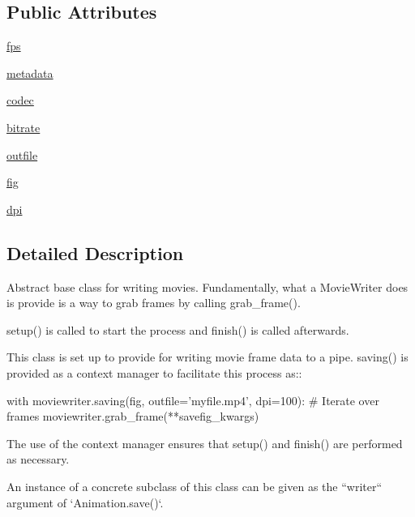\subsection*{Public Attributes}
\begin{DoxyCompactItemize}
\item 
\hyperlink{classmatplotlib_1_1animation_1_1AbstractMovieWriter_aaf7656da4e1f760b64f453cffbe15a82}{fps}
\item 
\hyperlink{classmatplotlib_1_1animation_1_1AbstractMovieWriter_a5a23958781c90f0aae7ac29ef6a7401f}{metadata}
\item 
\hyperlink{classmatplotlib_1_1animation_1_1AbstractMovieWriter_a0f1f647083b08f59de77ec4a3692e465}{codec}
\item 
\hyperlink{classmatplotlib_1_1animation_1_1AbstractMovieWriter_a8437f6e4c409bdd6392b1d354e9bc4c5}{bitrate}
\item 
\hyperlink{classmatplotlib_1_1animation_1_1AbstractMovieWriter_ae2006c1ca69618ec02514264a9f318e1}{outfile}
\item 
\hyperlink{classmatplotlib_1_1animation_1_1AbstractMovieWriter_a835eff7e0ac625992e7f708448e88fa6}{fig}
\item 
\hyperlink{classmatplotlib_1_1animation_1_1AbstractMovieWriter_aaca5ed6ef95c99e03830b346425ee9bc}{dpi}
\end{DoxyCompactItemize}


\subsection{Detailed Description}
\begin{DoxyVerb}Abstract base class for writing movies. Fundamentally, what a MovieWriter
does is provide is a way to grab frames by calling grab_frame().

setup() is called to start the process and finish() is called afterwards.

This class is set up to provide for writing movie frame data to a pipe.
saving() is provided as a context manager to facilitate this process as::

    with moviewriter.saving(fig, outfile='myfile.mp4', dpi=100):
        # Iterate over frames
        moviewriter.grab_frame(**savefig_kwargs)

The use of the context manager ensures that setup() and finish() are
performed as necessary.

An instance of a concrete subclass of this class can be given as the
``writer`` argument of `Animation.save()`.
\end{DoxyVerb}
 

